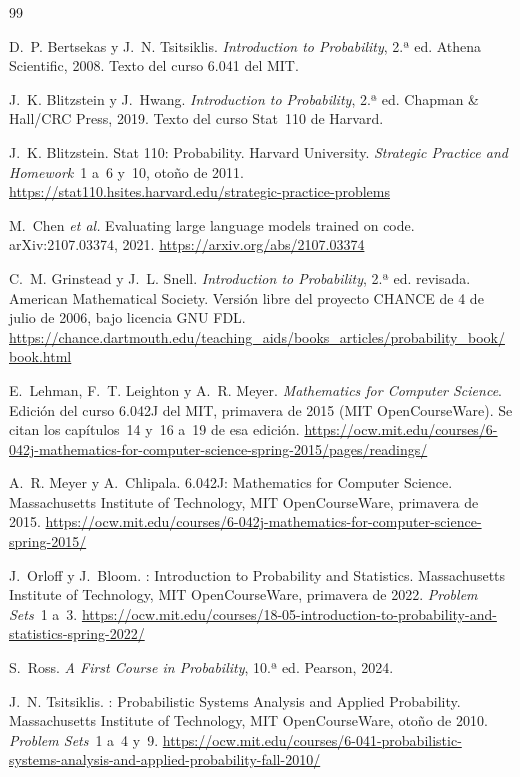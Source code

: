 \begin{thebibliography}{99}
\small

D.~P. Bertsekas y J.~N. Tsitsiklis.
\newblock \emph{Introduction to Probability}, 2.ª ed.
\newblock Athena Scientific, 2008.
\newblock Texto del curso 6.041 del MIT.

J.~K. Blitzstein y J.~Hwang.
\newblock \emph{Introduction to Probability}, 2.ª ed.
\newblock Chapman \& Hall/CRC Press, 2019.
\newblock Texto del curso Stat~110 de Harvard.

J.~K. Blitzstein.
\newblock Stat 110: Probability.
\newblock Harvard University. \emph{Strategic Practice and Homework}~1 a~6 y~10, otoño de 2011.
\newblock \url{https://stat110.hsites.harvard.edu/strategic-practice-problems}

M.~Chen \emph{et al.}
\newblock Evaluating large language models trained on code.
\newblock arXiv:2107.03374, 2021.
\newblock \url{https://arxiv.org/abs/2107.03374}

C.~M. Grinstead y J.~L. Snell.
\newblock \emph{Introduction to Probability}, 2.ª ed. revisada.
\newblock American Mathematical Society. Versión libre del proyecto CHANCE de 4 de julio de 2006, bajo licencia GNU FDL.
\newblock \url{https://chance.dartmouth.edu/teaching_aids/books_articles/probability_book/book.html}

E.~Lehman, F.~T. Leighton y A.~R. Meyer.
\newblock \emph{Mathematics for Computer Science}.
\newblock Edición del curso 6.042J del MIT, primavera de 2015 (MIT OpenCourseWare). Se citan los capítulos~14 y~16 a~19 de esa edición.
\newblock \url{https://ocw.mit.edu/courses/6-042j-mathematics-for-computer-science-spring-2015/pages/readings/}

A.~R. Meyer y A.~Chlipala.
\newblock 6.042J: Mathematics for Computer Science.
\newblock Massachusetts Institute of Technology, MIT OpenCourseWare, primavera de 2015.
\newblock \url{https://ocw.mit.edu/courses/6-042j-mathematics-for-computer-science-spring-2015/}

J.~Orloff y J.~Bloom.
: Introduction to Probability and Statistics.
\newblock Massachusetts Institute of Technology, MIT OpenCourseWare, primavera de 2022. \emph{Problem Sets}~1 a~3.
\newblock \url{https://ocw.mit.edu/courses/18-05-introduction-to-probability-and-statistics-spring-2022/}

S.~Ross.
\newblock \emph{A First Course in Probability}, 10.ª ed.
\newblock Pearson, 2024.

J.~N. Tsitsiklis.
: Probabilistic Systems Analysis and Applied Probability.
\newblock Massachusetts Institute of Technology, MIT OpenCourseWare, otoño de 2010. \emph{Problem Sets}~1 a~4 y~9.
\newblock \url{https://ocw.mit.edu/courses/6-041-probabilistic-systems-analysis-and-applied-probability-fall-2010/}

\end{thebibliography}

